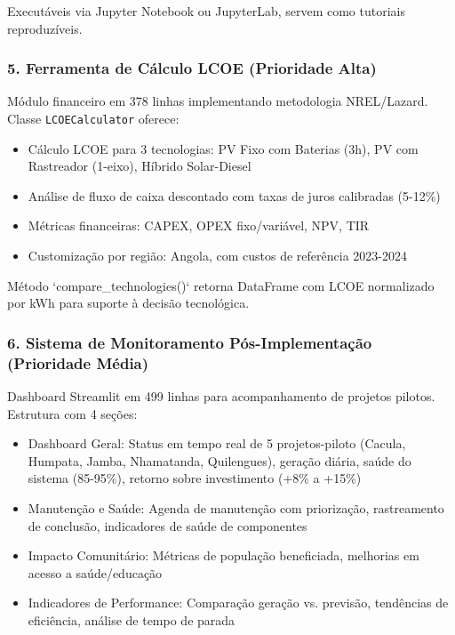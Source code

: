 \documentclass[12pt, a4paper]{article}
\begin{document}
Executáveis via Jupyter Notebook ou JupyterLab, servem como tutoriais reproduzíveis.

\subsubsection{5. Ferramenta de Cálculo LCOE (Prioridade Alta)}

Módulo financeiro em 378 linhas implementando metodologia NREL/Lazard. Classe \texttt{LCOECalculator} oferece:

\begin{itemize}
    \item Cálculo LCOE para 3 tecnologias: PV Fixo com Baterias (3h), PV com Rastreador (1-eixo), Híbrido Solar-Diesel
    \item Análise de fluxo de caixa descontado com taxas de juros calibradas (5-12\%)
    \item Métricas financeiras: CAPEX, OPEX fixo/variável, NPV, TIR
    \item Customização por região: Angola, com custos de referência 2023-2024
\end{itemize}

Método `compare\_technologies()` retorna DataFrame com LCOE normalizado por kWh para suporte à decisão tecnológica.

\subsubsection{6. Sistema de Monitoramento Pós-Implementação (Prioridade Média)}

Dashboard Streamlit em 499 linhas para acompanhamento de projetos pilotos. Estrutura com 4 seções:

\begin{itemize}
    \item Dashboard Geral: Status em tempo real de 5 projetos-piloto (Cacula, Humpata, Jamba, Nhamatanda, Quilengues), geração diária, saúde do sistema (85-95\%), retorno sobre investimento (+8\% a +15\%)
    \item Manutenção e Saúde: Agenda de manutenção com priorização, rastreamento de conclusão, indicadores de saúde de componentes
    \item Impacto Comunitário: Métricas de população beneficiada, melhorias em acesso a saúde/educação
    \item Indicadores de Performance: Comparação geração vs. previsão, tendências de eficiência, análise de tempo de parada
\end{itemize}
\end{document}
